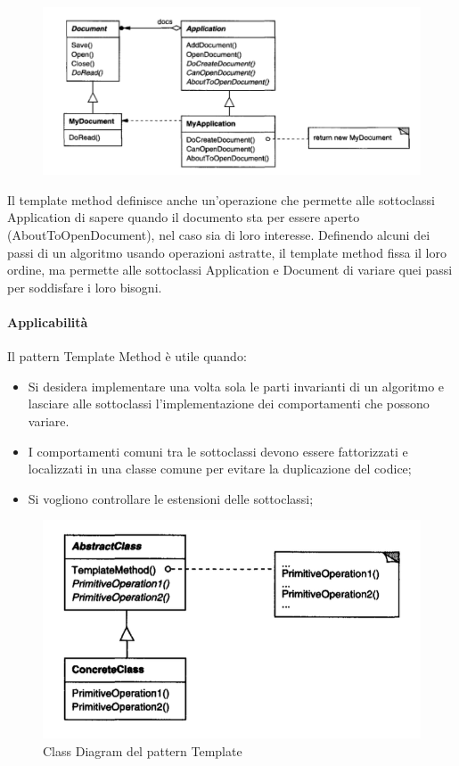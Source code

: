 \begin{figure}[H]
    \centering
    \includegraphics[width=0.75\linewidth]{assets/pattern/template-method/template-esempio.png}
\end{figure}

Il template method definisce anche un'operazione che permette alle sottoclassi Application di sapere quando il documento sta per essere aperto (AboutToOpenDocument), nel caso sia di loro interesse. Definendo alcuni dei passi di un algoritmo usando operazioni astratte, il template method fissa il loro ordine, ma permette alle sottoclassi Application e Document di variare quei passi per soddisfare i loro bisogni.

\paragraph{Applicabilità} Il pattern Template Method è utile quando:
\begin{itemize}
    \item Si desidera implementare una volta sola le parti invarianti di un algoritmo e lasciare alle sottoclassi l'implementazione dei comportamenti che possono variare.
    \item I comportamenti comuni tra le sottoclassi devono essere fattorizzati e localizzati in una classe comune per evitare la duplicazione del codice;
    \item Si vogliono controllare le estensioni delle sottoclassi;
\end{itemize}

\begin{figure}[H]
    \centering
    \includegraphics[width=0.5\linewidth]{assets/pattern/template-method/template-struttura.png}
    \caption{Class Diagram del pattern Template}
\end{figure}

